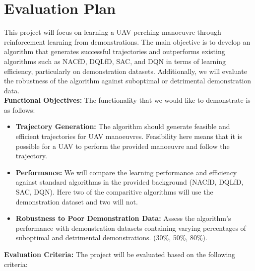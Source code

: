 \chapter{Evaluation Plan}

This project will focus on learning a UAV perching manoeuvre through reinforcement learning from demonstrations. 
The main objective is to develop an algorithm that generates successful trajectories and outperforms existing algorithms such as NACfD, DQLfD, SAC, and DQN in terms of learning efficiency, particularly on demonstration datasets. 
Additionally, we will evaluate the robustness of the algorithm against suboptimal or detrimental demonstration data. \\

\noindent
\textbf{Functional Objectives: }
The functionality that we would like to demonstrate is as follows:
\begin{itemize}
  \item \textbf{Trajectory Generation: } The algorithm should generate feasible and efficient trajectories for UAV manoeuvres.
  Feasibility here means that it is possible for a UAV to perform the provided manoeuvre and follow the trajectory.

  \item \textbf{Performance: } We will compare the learning performance and efficiency against standard algorithms in the provided background (NACfD, DQLfD, SAC, DQN).
  Here two of the comparitive algorithms will use the demonstration dataset and two will not.

  \item \textbf{Robustness to Poor Demonstration Data: } Assess the algorithm's performance with demonstration datasets containing varying percentages of suboptimal and detrimental demonstrations. (30\%, 50\%, 80\%).
  
\end{itemize}

\noindent
\textbf{Evaluation Criteria: }
The project will be evaluated based on the following criteria:

